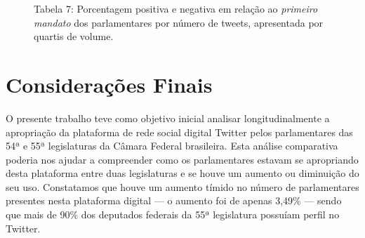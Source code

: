 \begin{figure}[!ht]

\caption{Tabela 7: Porcentagem positiva e negativa em relação ao \textit{primeiro mandato} dos parlamentares por número de tweets,
apresentada por quartis de volume.\footnotemark}
\end{figure}


\section{Considerações Finais}

O presente trabalho teve como objetivo inicial analisar
longitudinalmente a apropriação da plataforma de rede social digital
Twitter pelos parlamentares das 54ª e 55ª legislaturas da Câmara Federal
brasileira. Esta análise comparativa poderia nos ajudar a compreender
como os parlamentares estavam se apropriando desta plataforma entre duas
legislaturas e se houve um aumento ou diminuição do seu uso. Constatamos
que houve um aumento tímido no número de parlamentares presentes nesta
plataforma digital --- o aumento foi de apenas 3,49\% --- sendo que mais de
90\% dos deputados federais da 55ª legislatura possuíam perfil no
Twitter.

